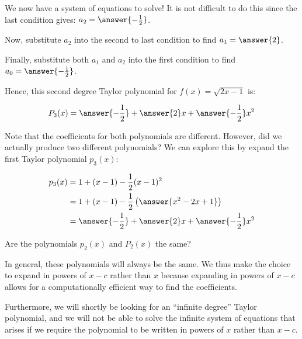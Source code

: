 \documentclass{ximera}
\begin{document}
\begin{exercise}
\begin{exercise}
\begin{exercise}
\begin{exercise}
We now have a system of equations to solve!  It is not difficult to do this since the last condition gives: $a_2 = \answer{-\frac{1}{2}}$.

Now, substitute $a_2$ into the second to last condition to find $a_1 = \answer{2}$. 

Finally, substitute both $a_1$ and $a_2$ into the first condition to find $a_0 = \answer{-\frac{1}{2}}$.

Hence, this second degree Taylor polynomial for $f(x) =\sqrt{2x-1}$ is:

\begin{align*}
P_3(x) &= \answer{-\frac{1}{2}}+\answer{2}x+\answer{-\frac{1}{2}}x^2\\
\end{align*}

\end{exercise}
\end{exercise}


Note that the coefficients for both polynomials are different.  However, did we actually produce two different polynomials?  We can explore this by expand the first Taylor polynomial $p_3(x)$:

\begin{align*}
p_3(x) &=1+(x-1)-\frac{1}{2}(x-1)^2\\
&=1+(x-1)-\frac{1}{2} \left(\answer{x^2-2x+1}\right)\\
&= \answer{-\frac{1}{2}}+\answer{2}x+\answer{-\frac{1}{2}}x^2
\end{align*}

Are the polynomials $p_2(x)$ and $P_2(x)$ the same?

\begin{multipleChoice}
\end{multipleChoice}

\begin{remark}
In general, these polynomials will always be the same.  We thus make the choice to expand in powers of $x-c$ rather than $x$ because expanding in powers of $x-c$ allows for a computationally efficient way to find the coefficients.  

Furthermore, we will shortly be looking for an ``infinite degree'' Taylor polynomial, and we will not be able to solve the infinite system of equations that arises if we require the polynomial to be written in powers of $x$ rather than $x-c$.
\end{remark}

\end{exercise}
\end{exercise}
\end{document}
